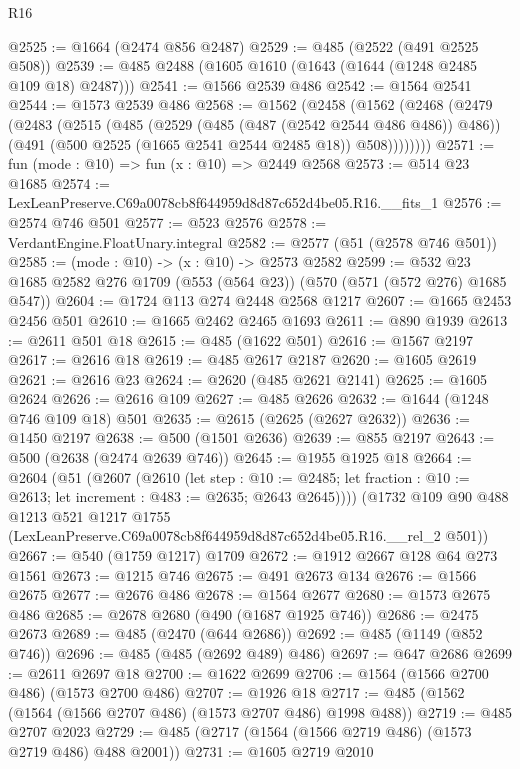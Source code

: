 \begin{lexlean}{R16}
\begin{coremodule}
@2525 := @1664 (@2474 @856 @2487)
@2529 := @485 (@2522 (@491 @2525 @508))
@2539 := @485 @2488 (@1605 @1610 (@1643 (@1644 (@1248 @2485 @109 @18) @2487)))
@2541 := @1566 @2539 @486
@2542 := @1564 @2541
@2544 := @1573 @2539 @486
@2568 := @1562
    (@2458
      (@1562
        (@2468
          (@2479
            (@2483
              (@2515
                (@485
                  (@2529 (@485 (@487 (@2542 @2544 @486 @486)) @486))
                  (@491 (@500 @2525 (@1665 @2541 @2544 @2485 @18)) @508))))))))
@2571 := fun (mode : @10) => fun (x : @10) => @2449 @2568
@2573 := @514 @23 @1685
@2574 := LexLeanPreserve.C69a0078cb8f644959d8d87c652d4be05.R16.__fits_1
@2576 := @2574 @746 @501
@2577 := @523 @2576
@2578 := VerdantEngine.FloatUnary.integral
@2582 := @2577 (@51 (@2578 @746 @501))
@2585 := (mode : @10) -> (x : @10) -> @2573 @2582
@2599 := @532 @23 @1685 @2582 @276 @1709 (@553 (@564 @23)) (@570 (@571 (@572 @276) @1685 @547))
@2604 := @1724 @113 @274 @2448 @2568 @1217
@2607 := @1665 @2453 @2456 @501
@2610 := @1665 @2462 @2465 @1693
@2611 := @890 @1939
@2613 := @2611 @501 @18
@2615 := @485 (@1622 @501)
@2616 := @1567 @2197
@2617 := @2616 @18
@2619 := @485 @2617 @2187
@2620 := @1605 @2619
@2621 := @2616 @23
@2624 := @2620 (@485 @2621 @2141)
@2625 := @1605 @2624
@2626 := @2616 @109
@2627 := @485 @2626
@2632 := @1644 (@1248 @746 @109 @18) @501
@2635 := @2615 (@2625 (@2627 @2632))
@2636 := @1450 @2197
@2638 := @500 (@1501 @2636)
@2639 := @855 @2197
@2643 := @500 (@2638 (@2474 @2639 @746))
@2645 := @1955 @1925 @18
@2664 := @2604
    (@51
      (@2607
        (@2610
          (let step : @10 := @2485;
          let fraction : @10 := @2613; let increment : @483 := @2635; @2643 @2645))))
    (@1732
      @109
      @90
      @488
      @1213
      @521
      @1217
      @1755
      (LexLeanPreserve.C69a0078cb8f644959d8d87c652d4be05.R16.__rel_2 @501))
@2667 := @540 (@1759 @1217) @1709
@2672 := @1912 @2667 @128 @64 @273 @1561
@2673 := @1215 @746
@2675 := @491 @2673 @134
@2676 := @1566 @2675
@2677 := @2676 @486
@2678 := @1564 @2677
@2680 := @1573 @2675 @486
@2685 := @2678 @2680 (@490 (@1687 @1925 @746))
@2686 := @2475 @2673
@2689 := @485 (@2470 (@644 @2686))
@2692 := @485 (@1149 (@852 @746))
@2696 := @485 (@485 (@2692 @489) @486)
@2697 := @647 @2686
@2699 := @2611 @2697 @18
@2700 := @1622 @2699
@2706 := @1564 (@1566 @2700 @486) (@1573 @2700 @486)
@2707 := @1926 @18
@2717 := @485 (@1562 (@1564 (@1566 @2707 @486) (@1573 @2707 @486) @1998 @488))
@2719 := @485 @2707 @2023
@2729 := @485 (@2717 (@1564 (@1566 @2719 @486) (@1573 @2719 @486) @488 @2001))
@2731 := @1605 @2719 @2010

\end{coremodule}
\end{lexlean}
